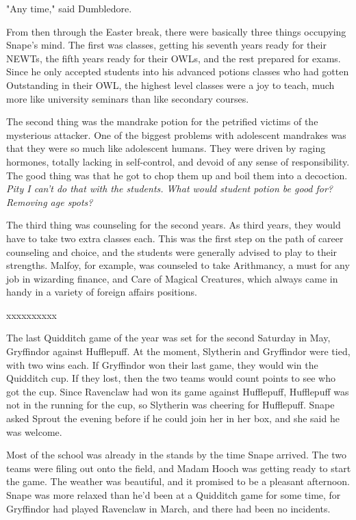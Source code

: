 \documentclass[a4paper,11pt]{article}
\begin{document}
"Any time," said Dumbledore.

From then through the Easter break, there were basically three things occupying Snape's mind. The first was classes, getting his seventh years ready for their NEWTs, the fifth years ready for their OWLs, and the rest prepared for exams. Since he only accepted students into his advanced potions classes who had gotten Outstanding in their OWL, the highest level classes were a joy to teach, much more like university seminars than like secondary courses.

The second thing was the mandrake potion for the petrified victims of the mysterious attacker. One of the biggest problems with adolescent mandrakes was that they were so much like adolescent humans. They were driven by raging hormones, totally lacking in self-control, and devoid of any sense of responsibility. The good thing was that he got to chop them up and boil them into a decoction. \emph{Pity I can't do that with the students. What would student potion be good for? Removing age spots?}

The third thing was counseling for the second years. As third years, they would have to take two extra classes each. This was the first step on the path of career counseling and choice, and the students were generally advised to play to their strengths. Malfoy, for example, was counseled to take Arithmancy, a must for any job in wizarding finance, and Care of Magical Creatures, which always came in handy in a variety of foreign affairs positions.

xxxxxxxxxx

The last Quidditch game of the year was set for the second Saturday in May, Gryffindor against Hufflepuff. At the moment, Slytherin and Gryffindor were tied, with two wins each. If Gryffindor won their last game, they would win the Quidditch cup. If they lost, then the two teams would count points to see who got the cup. Since Ravenclaw had won its game against Hufflepuff, Hufflepuff was not in the running for the cup, so Slytherin was cheering for Hufflepuff. Snape asked Sprout the evening before if he could join her in her box, and she said he was welcome.

Most of the school was already in the stands by the time Snape arrived. The two teams were filing out onto the field, and Madam Hooch was getting ready to start the game. The weather was beautiful, and it promised to be a pleasant afternoon. Snape was more relaxed than he'd been at a Quidditch game for some time, for Gryffindor had played Ravenclaw in March, and there had been no incidents.
\end{document}
